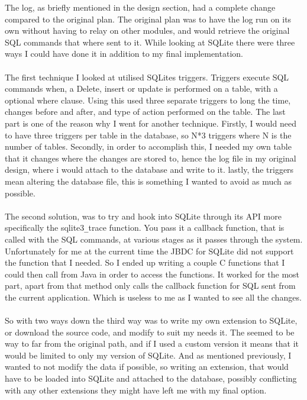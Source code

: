 The log, as briefly mentioned in the design section, had a complete change compared to the original plan. The original plan was to have the log run on its own without having to relay on other modules, and would retrieve the original SQL commands that where sent to it. While looking at SQLite there were three ways I could have done it in addition to my final implementation.
\\\\
The first technique I looked at utilised SQLites triggers. Triggers execute SQL commands when, a Delete, insert or update is performed on a table, with a optional where clause. Using this \cite{sqlitetriggers} used three separate triggers to long the time, changes before and after, and type of action performed on the table. The last part is one of the reason why I went for another technique. Firstly, I would need to have three triggers per table in the database, so N*3 triggers where N is the number of tables. Secondly, in order to accomplish this, I needed my own table that it changes where the changes are stored to, hence the log file in my original design, where i would attach to the database and write to it. lastly, the triggers mean altering the database file, this is something I wanted to avoid as much as possible.  
\\\\
The second solution, was to try and hook into SQLite through its API more specifically the sqlite3\verb|_|trace function. You pass it a callback function, that is called with the SQL commands, at various stages as it passes through the system. Unfortunately for me at the current time the JBDC for SQLite did not support the function that I needed. So I ended up writing a couple C functions that I could then call from Java in order to access the functions. It worked for the most part, apart from that method only calls the callback function for SQL sent from the current application. Which is useless to me as I wanted to see all the changes. 
\\\\
So with two ways down the third way was to write my own extension to SQLite, or download the source code, and modify to suit my needs it. The seemed to be way to far from the original path, and if I used a custom version it means that it would be limited to only my version of SQLite. And as mentioned previously, I wanted to not modify the data if possible, so writing an extension, that would have to be loaded into SQLite and attached to the database, possibly conflicting with any other extensions they might have left me with my final option.
